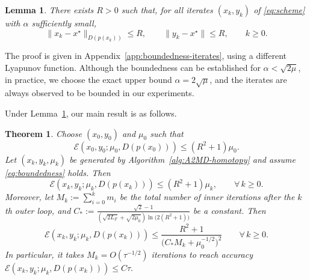 \documentclass{article}
\theoremstyle{plain}
\newtheorem{theorem}{Theorem}
\newtheorem{lemma}{Lemma}
\newtheorem{assumption}{Assumption}
\theoremstyle{remark}
\newcommand{\LC}[1]{\textcolor{red}{#1}}
\begin{document}
\begin{lemma}\label{assump:boundedness}
There exists $R>0$ such that, for all iterates $(x_k,y_k)$ of \eqref{eq:scheme} with $\alpha$ sufficiently small,
\begin{equation}\label{eq:boundedness}
\|x_k-x^\star\|_{D(p(x_k))}\le R,\qquad \|y_k-x^\star\|\le R,\qquad k\ge 0.
\end{equation}
\end{lemma}
The proof is given in Appendix~\ref{app:boundedness-iterates}, using a different Lyapunov function.
Although the boundedness can be established for $\alpha < \sqrt{2\mu}$, in practice, we choose the exact upper bound $\alpha=2\sqrt{\mu}$, and the iterates are always observed to be bounded in our experiments.


Under Lemma~\ref{assump:boundedness}, our main result is as follows.
\begin{theorem}
    \label{thm:homotopy}
Choose $(x_0,y_0)$ and $\mu_0$ such that
$$
\mathcal E(x_0,y_0;\mu_0,D(p(x_0)))\le (R^2+1)\mu_0.
$$
Let $(x_k,y_k,\mu_k)$ be generated by Algorithm~\ref{alg:A2MD-homotopy} and assume \eqref{eq:boundedness} holds. Then
\begin{equation}\label{eq:Ek-ek}
\mathcal E(x_k,y_k;\mu_k,D(p(x_k)))\le (R^2+1)\mu_k,
\qquad\forall\,k\ge 0.
\end{equation}
Moreover, let
$
M_k:=\sum_{i=0}^k m_i
$
be the total number of inner iterations after the $k$th outer loop, and
$
C_*:=\frac{\sqrt{2}-1}{(\sqrt{2L_F}+\sqrt{2\mu_0})\ln\bigl(2(R^2+1)\bigr)}
$
be a constant. Then
\begin{equation}%
\mathcal E(x_k,y_k;\mu_k,D(p(x_k)))\le \frac{R^2+1}{\bigl(C_*M_k+\mu_0^{-1/2}\bigr)^2}
\qquad\forall\,k\ge 0.
\end{equation}
In particular, it takes $M_k=O(\tau^{-1/2})$ iterations to reach accuracy
$
\mathcal E(x_k,y_k;\mu_k,D(p(x_k)))\leq C \tau.
$
\end{theorem}
\end{document}
